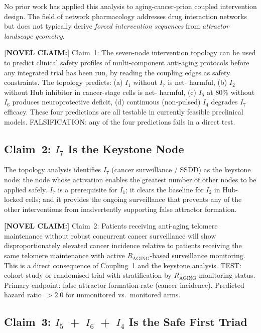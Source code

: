 \documentclass[12pt,a4paper]{article}
\newcommand{\raging}{$R_{\mathrm{AGING}}$}
\newcommand{\novel}[1]{\noindent\colorbox{yellow!18}{\parbox{\dimexpr\linewidth-2\fboxsep}{%
  \textbf{[NOVEL CLAIM:]} #1}}\vspace{0.4em}}
\newcommand{\Inet}[1]{$I_{#1}$}
\begin{document}
No prior work has applied this analysis to aging-cancer-prion coupled
intervention design. The field of network pharmacology addresses drug
interaction networks but does not typically derive \textit{forced intervention
sequences} from \textit{attractor landscape geometry}.

\novel{Claim~1: The seven-node intervention topology can be used to predict
clinical safety profiles of multi-component anti-aging protocols before any
integrated trial has been run, by reading the coupling edges as safety
constraints. The topology predicts: (a) \Inet{1} without \Inet{7} is net-
harmful, (b) \Inet{2} without Hub inhibitor in cancer-stage cells is net-
harmful, (c) \Inet{5} at 80\% without \Inet{6} produces neuroprotective
deficit, (d) continuous (non-pulsed) \Inet{4} degrades \Inet{7} efficacy.
These four predictions are all testable in currently feasible preclinical
models. FALSIFICATION: any of the four predictions fails in a direct test.}

\subsection{Claim~2: \texorpdfstring{\Inet{7}}{I7} Is the Keystone Node}

The topology analysis identifies \Inet{7} (cancer surveillance / SSDD) as
the keystone node: the node whose activation enables the greatest number of
other nodes to be applied safely. \Inet{7} is a prerequisite for \Inet{1};
it clears the baseline for \Inet{2} in Hub-locked cells; and it provides the
ongoing surveillance that prevents any of the other interventions from
inadvertently supporting false attractor formation.

\novel{Claim~2: Patients receiving anti-aging telomere maintenance without
robust concurrent cancer surveillance will show disproportionately elevated
cancer incidence relative to patients receiving the same telomere maintenance
with active \raging{}-based surveillance monitoring. This is a direct
consequence of Coupling~1 and the keystone analysis. TEST: cohort study or
randomised trial with stratification by \raging{} monitoring status. Primary
endpoint: false attractor formation rate (cancer incidence). Predicted
hazard ratio~$> 2.0$ for unmonitored vs.\ monitored arms.}

\subsection{Claim~3: \texorpdfstring{\Inet{5}~+~\Inet{6}~+~\Inet{4}}{I5+I6+I4}
Is the Safe First Triad}
\end{document}
